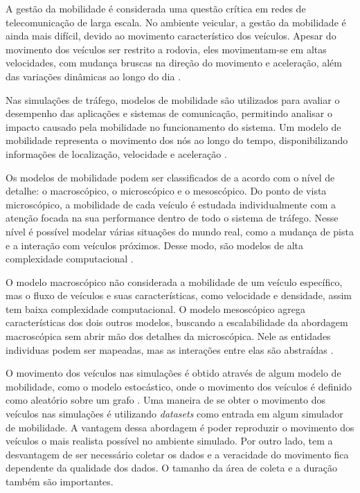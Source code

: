 \documentclass[mestrado, pre-defesa, english, brazil]{packages/icmc}
\begin{document}
A gestão da mobilidade é considerada uma questão crítica em redes de telecomunicação de larga escala. No ambiente veicular, a gestão da mobilidade é ainda mais difícil, devido ao movimento característico dos veículos. Apesar do movimento dos veículos ser restrito a rodovia, eles movimentam-se em altas velocidades, com mudança bruscas na direção do movimento e aceleração, além das variações dinâmicas ao longo do dia \cite{uppoor-2012}.

Nas simulações de tráfego, modelos de mobilidade são utilizados para avaliar o desempenho das aplicações e sistemas de comunicação, permitindo analisar o impacto causado pela mobilidade no funcionamento do sistema. Um modelo de mobilidade representa o movimento dos nós ao longo do tempo, disponibilizando informações de localização, velocidade e aceleração \cite{vieira-2011}.

Os modelos de mobilidade podem ser classificados de a acordo com o nível de detalhe: o macroscópico, o microscópico e o mesoscópico. Do ponto de vista microscópico, a mobilidade de cada veículo é estudada individualmente com a atenção focada na sua performance dentro de todo o sistema de tráfego. Nesse nível é possível modelar várias situações do mundo real, como a mudança de pista e a interação com veículos próximos. Desse modo, são modelos de alta complexidade computacional \cite{vieira-2011,tavares-2013}.

O modelo macroscópico não considerada a mobilidade de um veículo específico, mas o fluxo de veículos e suas características, como velocidade e densidade, assim tem baixa complexidade computacional. O modelo mesoscópico agrega características dos dois outros modelos, buscando a escalabilidade da abordagem macroscópica sem abrir mão dos detalhes da microscópica. Nele as entidades individuas podem ser mapeadas, mas as interações entre elas são abstraídas \cite{tavares-2013,vieira-2011}.

O movimento dos veículos nas simulações é obtido através de algum modelo de mobilidade, como o modelo estocástico, onde o movimento dos veículos é definido como aleatório sobre um grafo \cite{vieira-2011}. Uma maneira de se obter o movimento dos veículos nas simulações é utilizando \textit{datasets} como entrada em algum simulador de mobilidade. A vantagem dessa abordagem é poder reproduzir o movimento dos veículos o mais realista possível no ambiente simulado. Por outro lado, tem a desvantagem de ser necessário coletar os dados e a veracidade do movimento fica dependente da qualidade dos dados. O tamanho da área de coleta e a duração também são importantes.
\end{document}

